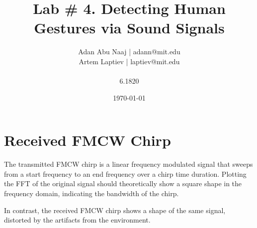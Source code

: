 \documentclass{lab}
\title{Lab \# 4. Detecting Human Gestures via Sound Signals} %
\author{Adan Abu Naaj | adann@mit.edu \\ Artem Laptiev | laptiev@mit.edu \\\\ 6.1820} %
\date{\today} %
\begin{document}
\maketitle

\newpage

\section{Received FMCW Chirp}

The transmitted FMCW chirp is a linear frequency modulated signal that sweeps from a start frequency to an end frequency over a chirp time duration. Plotting the FFT of the original signal should theoretically show a square shape in the frequency domain, indicating the bandwidth of the chirp.

In contrast, the received FMCW chirp shows a shape of the same signal, distorted by the artifacts from the environment. 
\end{document}
